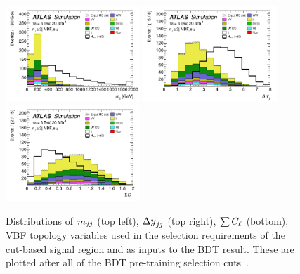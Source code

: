 \begin{figure}[h!]
  \centering
  \captionsetup{justification=centering}
  \includegraphics[width=0.45\textwidth]{figures/BDT_mjj}
  \includegraphics[width=0.45\textwidth]{figures/BDT_dyjj}
  \includegraphics[width=0.45\textwidth]{figures/BDT_olv}
  \caption{Distributions of $m_{jj}$ (top left), $\dyjj$ (top right), $\sum C_{\ell}$ (bottom), VBF topology variables used in the selection requirements of the cut-based signal region and as inputs to the BDT result. These are plotted after all of the BDT pre-training selection cuts~\cite{WW2015}.}
  \label{fig:vbf_bdt_vbftopo}
\end{figure}




